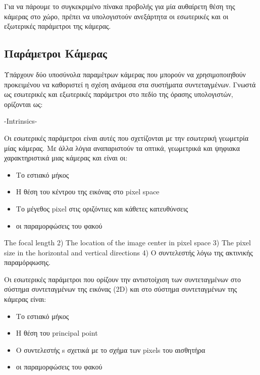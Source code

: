 Για να πάρουμε το συγκεκριμένο πίνακα προβολής για μία αυθαίρετη θέση της κάμερας στο χώρο, πρέπει να υπολογιστούν ανεξάρτητα οι εσωτερικές και οι εξωτερικές παράμετροι της κάμερας. 




\subsection{Παράμετροι Κάμερας}

Υπάρχουν δύο υποσύνολα παραμέτρων κάμερας που μπορούν να χρησιμοποιηθούν προκειμένου να καθοριστεί η σχέση ανάμεσα στα συστήματα συντεταγμένων.
Γνωστά ως εσωτερικές και εξωτερικές παράμετροι στο πεδίο της όρασης υπολογιστών, ορίζονται ως:



-Intrinsics-


Οι εσωτερικές παράμετροι είναι αυτές που σχετίζονται με την εσωτερική γεωμετρία μίας κάμερας. Με άλλα λόγια αναπαριστούν τα οπτικά, γεωμετρικά και ψηφιακα χαρακτηριστικά μιας κάμερας και είναι οι:

\begin{itemize}
\item Το εστιακό μήκος
\item Η θέση του κέντρου της εικόνας στο pixel space
\item Το μέγεθος pixel στις οριζόντιες και κάθετες κατευθύνσεις
\item οι παραμορφώσεις του φακού
\end{itemize}

The focal length
2) The location of the image center in pixel space
3) The pixel size in the horizontal and vertical directions
4) Ο συντελεστής λόγω της ακτινικής παραμόρφωσης.




Οι εσωτερικές παράμετροι που ορίζουν την αντιστοίχιση των συντεταγμένων στο σύστημα συντεταγμένων της εικόνας (2D) και στο σύστημα συντεταγμένων της κάμερας είναι:

\begin{itemize}
\item Το εστιακό μήκος
\item Η θέση του principal point
\item Ο συντελεστής s σχετικά με το σχήμα των pixels του αισθητήρα
\item οι παραμορφώσεις του φακού
\end{itemize}





